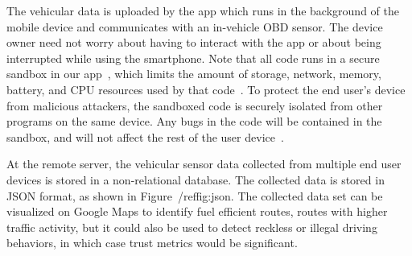 The vehicular data is uploaded by the app
which runs in the background of the mobile device and communicates
with an in-vehicle OBD sensor. The device owner need not worry about having to
interact with the app or about being interrupted while using the smartphone. 
Note that all code runs in a secure sandbox in our 
app~\cite{sensor-app}, which limits the amount of storage, network, 
memory, battery, and CPU resources used by that code~\cite{Cappos_CCS_10}. 
To protect the end user's device from malicious attackers, the sandboxed 
code is securely isolated from other programs on the same device.
Any bugs in the code will be contained in the sandbox, and will not 
affect the rest of the user device~\cite{Cappos_CCS_10}. 
%

At the remote server, the vehicular sensor data collected from 
multiple end user devices is stored in a non-relational database. 
The collected data is stored in JSON format, as shown in Figure~/ref{fig:json}.
The collected data set can be visualized on Google Maps to 
identify fuel efficient routes, routes with higher traffic activity, 
but it could also be used to detect reckless or illegal driving behaviors,
in which case trust metrics would be significant.



